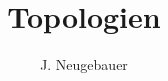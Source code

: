 \documentclass[10pt, a4paper]{scrartcl}
\author{J. Neugebauer}
\title{Topologien}
\date{\Heute}
\begin{document}
\ReiheTitel
\end{document}
